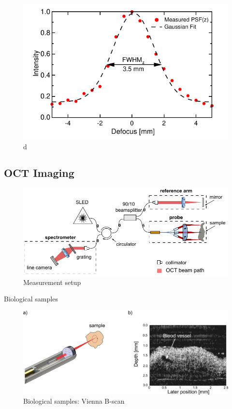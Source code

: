 \begin{figure}[h!]\centering \includegraphics{figures/50_Measurements/conf/res/PSFz.pdf}
      \caption{d}
\end{figure}

\clearpage
\subsection{OCT Imaging}
\begin{figure}[h!]\centering \includegraphics{figures/50_Measurements/oct/octSetup.pdf}
      \caption{Measurement setup}
\end{figure}


Biological samples
\begin{figure}[h!]\centering \includegraphics[width=12cm]{figures/50_Measurements/oct/Measurement_arrangement.png}
      \caption{Biological samples: Vienna B-scan}
\end{figure}
